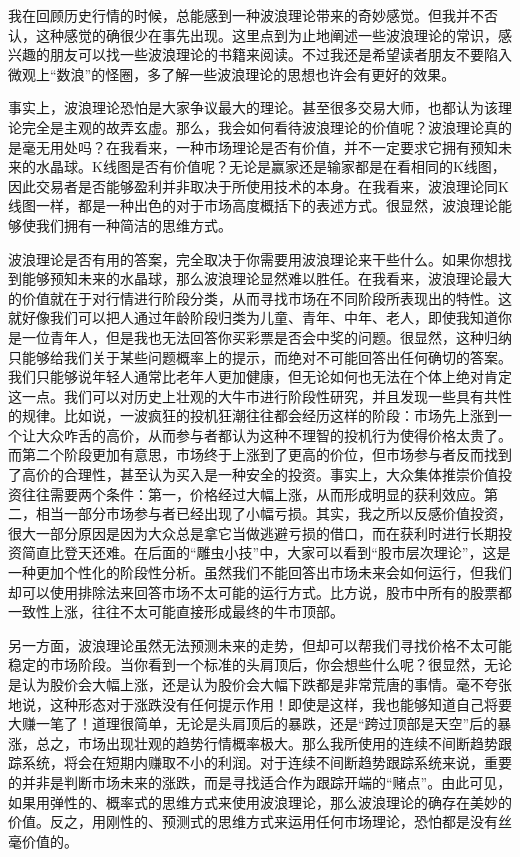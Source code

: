 我在回顾历史行情的时候，总能感到一种波浪理论带来的奇妙感觉。但我并不否认，这种感觉的确很少在事先出现。这里点到为止地阐述一些波浪理论的常识，感兴趣的朋友可以找一些波浪理论的书籍来阅读。不过我还是希望读者朋友不要陷入微观上“数浪”的怪圈，多了解一些波浪理论的思想也许会有更好的效果。

事实上，波浪理论恐怕是大家争议最大的理论。甚至很多交易大师，也都认为该理论完全是主观的故弄玄虚。那么，我会如何看待波浪理论的价值呢？波浪理论真的是毫无用处吗？在我看来，一种市场理论是否有价值，并不一定要求它拥有预知未来的水晶球。K线图是否有价值呢？无论是赢家还是输家都是在看相同的K线图，因此交易者是否能够盈利并非取决于所使用技术的本身。在我看来，波浪理论同K线图一样，都是一种出色的对于市场高度概括下的表述方式。很显然，波浪理论能够使我们拥有一种简洁的思维方式。

波浪理论是否有用的答案，完全取决于你需要用波浪理论来干些什么。如果你想找到能够预知未来的水晶球，那么波浪理论显然难以胜任。在我看来，波浪理论最大的价值就在于对行情进行阶段分类，从而寻找市场在不同阶段所表现出的特性。这就好像我们可以把人通过年龄阶段归类为儿童、青年、中年、老人，即使我知道你是一位青年人，但是我也无法回答你买彩票是否会中奖的问题。很显然，这种归纳只能够给我们关于某些问题概率上的提示，而绝对不可能回答出任何确切的答案。我们只能够说年轻人通常比老年人更加健康，但无论如何也无法在个体上绝对肯定这一点。我们可以对历史上壮观的大牛市进行阶段性研究，并且发现一些具有共性的规律。比如说，一波疯狂的投机狂潮往往都会经历这样的阶段：市场先上涨到一个让大众咋舌的高价，从而参与者都认为这种不理智的投机行为使得价格太贵了。而第二个阶段更加有意思，市场终于上涨到了更高的价位，但市场参与者反而找到了高价的合理性，甚至认为买入是一种安全的投资。事实上，大众集体推崇价值投资往往需要两个条件：第一，价格经过大幅上涨，从而形成明显的获利效应。第二，相当一部分市场参与者已经出现了小幅亏损。其实，我之所以反感价值投资，很大一部分原因是因为大众总是拿它当做逃避亏损的借口，而在获利时进行长期投资简直比登天还难。在后面的“雕虫小技”中，大家可以看到“股市层次理论”，这是一种更加个性化的阶段性分析。虽然我们不能回答出市场未来会如何运行，但我们却可以使用排除法来回答市场不太可能的运行方式。比方说，股市中所有的股票都一致性上涨，往往不太可能直接形成最终的牛市顶部。

另一方面，波浪理论虽然无法预测未来的走势，但却可以帮我们寻找价格不太可能稳定的市场阶段。当你看到一个标准的头肩顶后，你会想些什么呢？很显然，无论是认为股价会大幅上涨，还是认为股价会大幅下跌都是非常荒唐的事情。毫不夸张地说，这种形态对于涨跌没有任何提示作用！即使是这样，我也能够知道自己将要大赚一笔了！道理很简单，无论是头肩顶后的暴跌，还是“跨过顶部是天空”后的暴涨，总之，市场出现壮观的趋势行情概率极大。那么我所使用的连续不间断趋势跟踪系统，将会在短期内赚取不小的利润。对于连续不间断趋势跟踪系统来说，重要的并非是判断市场未来的涨跌，而是寻找适合作为跟踪开端的“赌点”。由此可见，如果用弹性的、概率式的思维方式来使用波浪理论，那么波浪理论的确存在美妙的价值。反之，用刚性的、预测式的思维方式来运用任何市场理论，恐怕都是没有丝毫价值的。

